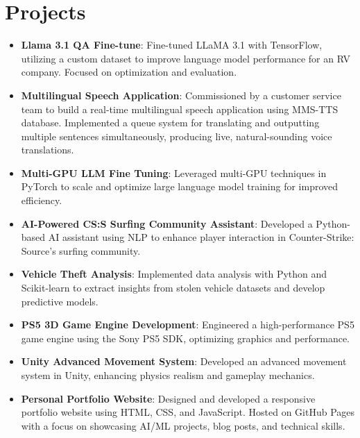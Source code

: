 \documentclass[letterpaper,11pt]{article}
\newcommand{\resumeItem}[2]{
  \item\small{
    \textbf{#1}{: #2 \vspace{-2pt}}
  }
}
\newcommand{\resumeSubItem}[2]{\resumeItem{#1}{#2}\vspace{-4pt}}
\newcommand{\resumeSubHeadingListStart}{\begin{itemize}[leftmargin=*, itemsep=0pt]}
\newcommand{\resumeSubHeadingListEnd}{\end{itemize}}
\begin{document}
\section{Projects}
    \resumeSubHeadingListStart  
      \resumeSubItem{Llama 3.1 QA Fine-tune}
        {Fine-tuned LLaMA 3.1 with TensorFlow, utilizing a custom dataset to improve language model performance for an RV company. Focused on optimization and evaluation.}
      \resumeSubItem{Multilingual Speech Application}
        {Commissioned by a customer service team to build a real-time multilingual speech application using MMS-TTS database. Implemented a queue system for translating and outputting multiple sentences simultaneously, producing live, natural-sounding voice translations.}
      \resumeSubItem{Multi-GPU LLM Fine Tuning}
        {Leveraged multi-GPU techniques in PyTorch to scale and optimize large language model training for improved efficiency.}
      \resumeSubItem{AI-Powered CS:S Surfing Community Assistant}
        {Developed a Python-based AI assistant using NLP to enhance player interaction in Counter-Strike: Source’s surfing community.}
      \resumeSubItem{Vehicle Theft Analysis}
        {Implemented data analysis with Python and Scikit-learn to extract insights from stolen vehicle datasets and develop predictive models.}
      \resumeSubItem{PS5 3D Game Engine Development}
        {Engineered a high-performance PS5 game engine using the Sony PS5 SDK, optimizing graphics and performance.}
      \resumeSubItem{Unity Advanced Movement System}
        {Developed an advanced movement system in Unity, enhancing physics realism and gameplay mechanics.}
      \resumeSubItem{Personal Portfolio Website}
        {Designed and developed a responsive portfolio website using HTML, CSS, and JavaScript. Hosted on GitHub Pages with a focus on showcasing AI/ML projects, blog posts, and technical skills.}
    \resumeSubHeadingListEnd
\end{document}
